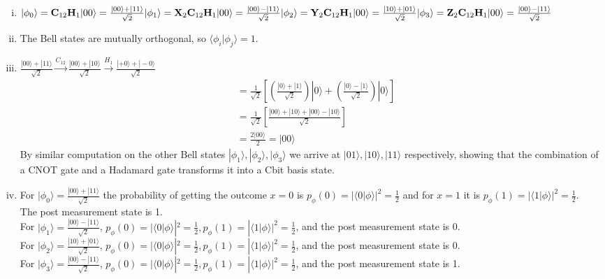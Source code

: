 \documentclass[11pt]{article}
\newenvironment{solution}{\begin{mdframed}[skipabove=\baselineskip,innertopmargin=\baselineskip,innerbottommargin=\baselineskip]
  }{\end{mdframed}}
\begin{document}
\begin{solution}
\begin{enumerate}[(i)]
    \item $
    |\phi_0\rangle = \textbf{C}_{12}\textbf{H}_1|00\rangle = \frac{|00\rangle+|11\rangle}{\sqrt{2}}\\
    |\phi_1\rangle = \textbf{X}_2\textbf{C}_{12}\textbf{H}_1|00\rangle = \frac{|00\rangle-|11\rangle}{\sqrt{2}}\\
    |\phi_2\rangle = \textbf{Y}_2\textbf{C}_{12}\textbf{H}_1|00\rangle = \frac{|10\rangle+|01\rangle}{\sqrt{2}}\\
    |\phi_3\rangle = \textbf{Z}_2\textbf{C}_{12}\textbf{H}_1|00\rangle = \frac{|00\rangle-|11\rangle}{\sqrt{2}}$
    
    \item The Bell states are mutually orthogonal, so $\langle\phi_i|\phi_j\rangle = 1$.
    
    \item $\frac{|00\rangle+|11\rangle}{\sqrt{2}} \xrightarrow{C_{12}} 
    \frac{|00\rangle+|10\rangle}{\sqrt{2}} \xrightarrow{H_1} \frac{|+0\rangle+|-0\rangle}{\sqrt{2}}$
    \begin{align*}
        &= \frac{1}{\sqrt{2}}\left[\left(\frac{|0\rangle+|1\rangle}{\sqrt{2}}\right)|0\rangle + \left(\frac{|0\rangle-|1\rangle}{\sqrt{2}}\right)|0\rangle\right] \\
        &= \frac{1}{\sqrt{2}}\left[ \frac{|00\rangle+|10\rangle+|00\rangle-|10\rangle}{\sqrt{2}} \right] \\
        &= \frac{2|00\rangle}{2} = |00\rangle
    \end{align*}
    By similar computation on the other Bell states $|\phi_1\rangle,|\phi_2\rangle,|\phi_3\rangle$ we arrive at $|01\rangle,|10\rangle,|11\rangle$ respectively, showing that the combination of a CNOT gate and a Hadamard gate transforms it into a Cbit basis state.
    \item 
    For $|\phi_0\rangle = \frac{|00\rangle+|11\rangle}{\sqrt{2}}$ the probability of getting the outcome $x = 0$ is $p_\phi(0) = |\langle0|\phi\rangle|^2 = \frac{1}{2}$ and for $x = 1$ it is $p_\phi(1) = |\langle1|\phi\rangle|^2 = \frac{1}{2}$. \\ The post measurement state is 1. \\
    
    For $|\phi_1\rangle = \frac{|00\rangle-|11\rangle}{\sqrt{2}}$,  $p_\phi(0) = |\langle0|\phi\rangle|^2 = \frac{1}{2}, p_\phi(1) = |\langle1|\phi\rangle|^2 = \frac{1}{2}$, and the post measurement state is 0. \\
    
    For $|\phi_2\rangle = \frac{|10\rangle+|01\rangle}{\sqrt{2}}$,  $p_\phi(0) = |\langle0|\phi\rangle|^2 = \frac{1}{2}, p_\phi(1) = |\langle1|\phi\rangle|^2 = \frac{1}{2}$, and the post measurement state is 0. \\
    
    For $|\phi_3\rangle = \frac{|00\rangle-|11\rangle}{\sqrt{2}}$,  $p_\phi(0) = |\langle0|\phi\rangle|^2 = \frac{1}{2}, p_\phi(1) = |\langle1|\phi\rangle|^2 = \frac{1}{2}$, and the post measurement state is 1. \\
\end{enumerate}
\end{solution} 
\end{document}
